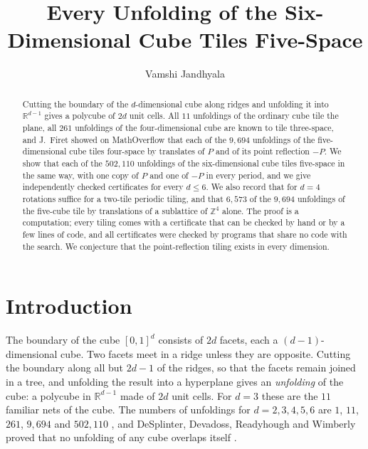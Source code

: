 \documentclass[11pt]{amsart}
\title{Every Unfolding of the Six-Dimensional Cube Tiles Five-Space}
\author{Vamshi Jandhyala}
\theoremstyle{definition}
\theoremstyle{remark}
\newcommand{\Z}{\mathbb{Z}}
\newcommand{\R}{\mathbb{R}}
\begin{document}
\begin{abstract}
Cutting the boundary of the $d$-dimensional cube along ridges and unfolding it into $\R^{d-1}$ gives a polycube of $2d$ unit cells. All $11$ unfoldings of the ordinary cube tile the plane, all $261$ unfoldings of the four-dimensional cube are known to tile three-space, and J.~Firet showed on MathOverflow that each of the $9{,}694$ unfoldings of the five-dimensional cube tiles four-space by translates of $P$ and of its point reflection $-P$. We show that each of the $502{,}110$ unfoldings of the six-dimensional cube tiles five-space in the same way, with one copy of $P$ and one of $-P$ in every period, and we give independently checked certificates for every $d\le6$. We also record that for $d=4$ rotations suffice for a two-tile periodic tiling, and that $6{,}573$ of the $9{,}694$ unfoldings of the five-cube tile by translations of a sublattice of $\Z^4$ alone. The proof is a computation; every tiling comes with a certificate that can be checked by hand or by a few lines of code, and all certificates were checked by programs that share no code with the search. We conjecture that the point-reflection tiling exists in every dimension.
\end{abstract}

\maketitle

\section{Introduction}

The boundary of the cube $[0,1]^d$ consists of $2d$ facets, each a $(d-1)$-dimensional cube. Two facets meet in a ridge unless they are opposite. Cutting the boundary along all but $2d-1$ of the ridges, so that the facets remain joined in a tree, and unfolding the result into a hyperplane gives an \emph{unfolding} of the cube: a polycube in $\R^{d-1}$ made of $2d$ unit cells. For $d=3$ these are the $11$ familiar nets of the cube. The numbers of unfoldings for $d=2,3,4,5,6$ are $1$, $11$, $261$, $9{,}694$ and $502{,}110$ \cite{OEIS91159}, and DeSplinter, Devadoss, Readyhough and Wimberly proved that no unfolding of any cube overlaps itself \cite{DDRW}.
\end{document}

